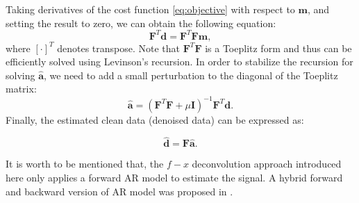 Taking derivatives of the cost function \ref{eq:objective} with respect to $\mathbf{m}$, and setting the result to zero, we can obtain the following equation:
\begin{equation}
\label{eq:derivative}
\mathbf{F}^T\mathbf{d}=\mathbf{F}^{T}\mathbf{Fm},
\end{equation}
where $[\cdot]^T$ denotes transpose. Note that $\mathbf{F}^T\mathbf{F}$ is a Toeplitz form and thus can be efficiently solved using Levinson's recursion. In order to stabilize the recursion for solving $\hat{\mathbf{a}}$, we need to add a small perturbation to the diagonal of the Toeplitz matrix:
\begin{equation}
\label{eq:solution}
\hat{\mathbf{a}}= (\mathbf{F}^{T}\mathbf{F}+\mu\mathbf{I})^{-1}\mathbf{F}^T\mathbf{d}.
\end{equation}
Finally, the estimated clean data (denoised data) can be expressed as:

\begin{equation}
\label{eq:solution1}
\hat{\mathbf{d}}= \mathbf{F}\hat{\mathbf{a}}.
\end{equation}

It is worth to be mentioned that, the $f-x$ deconvolution approach introduced here only applies a forward AR model to estimate the signal. A hybrid forward and backward version of AR model was proposed in \cite{yanghua1999}.













